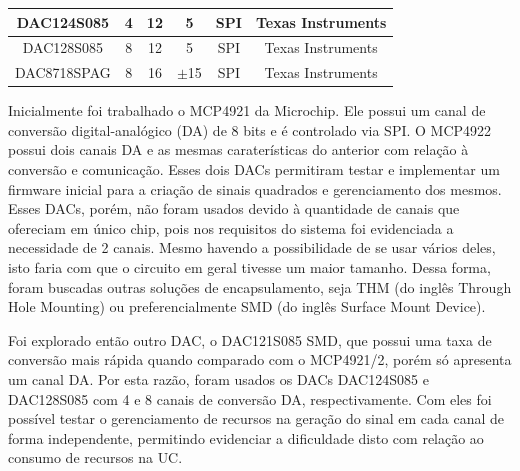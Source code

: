 \begin{table}[h]
\begin{tabular}{|c|c|c|c|c|c|}
    DAC124S085                                                            & 4                                                              & 12                                                                    & 5                                                                                  & SPI                                                                      & Texas Instruments      \\ \hline
    DAC128S085                                                            & 8                                                              & 12                                                                    & 5                                                                                  & SPI                                                                      & Texas Instruments      \\ \hline
    DAC8718SPAG                                                           & 8                                                              & 16                                                                    & $\mathrm{\pm}$15                                                                               & SPI                                                                      & Texas Instruments      \\ \hline
    \end{tabular}
    \label{tab:c4_dac2}
\end{table}

Inicialmente foi trabalhado o MCP4921 da Microchip. Ele possui um canal de conversão digital-analógico (\acrshort{DA}) de 8 bits e é controlado via \acrshort{SPI}. O MCP4922 possui dois canais \acrshort{DA} e as mesmas caraterísticas do anterior com relação à conversão e comunicação. Esses dois \acrshort{DAC}s permitiram testar e implementar um firmware inicial para a criação de sinais quadrados e gerenciamento dos mesmos. Esses \acrshort{DAC}s, porém, não foram usados devido à quantidade de canais que ofereciam em único chip, pois nos requisitos do sistema foi evidenciada a necessidade de 2 canais. Mesmo havendo a possibilidade de se usar vários deles, isto faria com que o circuito em geral tivesse um maior tamanho. Dessa forma, foram buscadas outras soluções de encapsulamento, seja \acrshort{THM} (do inglês Through Hole Mounting) ou preferencialmente \acrshort{SMD} (do inglês Surface Mount Device).

Foi explorado então outro DAC, o DAC121S085 \acrshort{SMD}, que possui uma taxa de conversão mais rápida quando comparado com o MCP4921/2, porém só apresenta um canal \acrshort{DA}. Por esta razão, foram usados os \acrshort{DAC}s DAC124S085 e DAC128S085 com 4 e 8 canais de conversão \acrshort{DA}, respectivamente. Com eles foi possível testar o gerenciamento de recursos na geração do sinal em cada canal de forma independente, permitindo evidenciar a dificuldade disto com relação ao consumo de recursos na \acrshort{UC}. 

